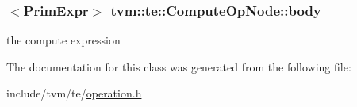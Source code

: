 \subsubsection[{\texorpdfstring{body}{body}}]{$<${\bf Prim\+Expr}$>$ tvm\+::te\+::\+Compute\+Op\+Node\+::body}\hypertarget{classtvm_1_1te_1_1ComputeOpNode_a1486068943f10fbf785ede621c15ed74}{}\label{classtvm_1_1te_1_1ComputeOpNode_a1486068943f10fbf785ede621c15ed74}


the compute expression 



The documentation for this class was generated from the following file\+:\begin{DoxyCompactItemize}
\item 
include/tvm/te/\hyperlink{operation_8h}{operation.\+h}\end{DoxyCompactItemize}
